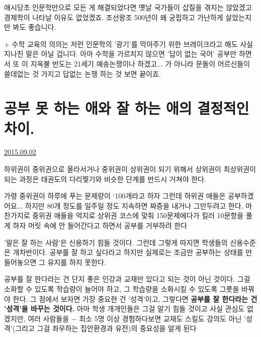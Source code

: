 애시당초 인문학만으로 모든 게 해결되었다면 옛날 국가들이 삽질을 겪지는 않았겠고
경제학이 나타날 이유도 없었겠죠.
조선왕조 500년이 왜 궁핍하고 가난하게 살았는지만 봐도 좋습니다.
\vspace{5mm}

+ 수학 교육의 의의는 저런 인문학의 '광기'를 막아주기 위한 브레이크라고 해도 사실 지나친 말은 아닐 겁니다.
아마 수학을 가르치지 않으면 '답이 없는 국어' 공부만 하면서 또 이 지옥불 반도는 21세기 예송논쟁이나 하겠고... 가 아니라
문돌이 어르신들이 쓸데없는 것 가지고 답없는 논쟁 하는 것 보면 끝이죠.
\vspace{5mm}








\section{공부 못 하는 애와 잘 하는 애의 결정적인 차이.}
\href{https://www.kockoc.com/Apoc/284872}{2015.09.02}

\vspace{5mm}

하위권이 중위권으로 올라서거나 중위권이 상위권이 되기 위해서
상위권이 최상위권이 되는 과정은 태권도의 다리찢기와 비슷한 단계를 반드시 거쳐야 한다.
\vspace{5mm}

가령 중위권이 하루에 푸는 문제량이 `100개라고 하자
그런데 하위권 애들은 공부하겠어요... 하지만 80개 정도를 일주일 정도 지속하면 짜증을 내거나 그만두려고 한다.
마찬가지로 중위권 애들을 억지로 상위권 코스에 맞춰 150문제에다가 킬러 10문항을 풀게 하자
머릿 속에 안 들어간다고 하면서 공부를 거부하려 한다
\vspace{5mm}

'말은 잘 하는 사람'은 신용하기 힘들 것이다.
그런데 그렇게 따지면 학생들의 신용수준은 개차반이다.
공부를 잘 하고 싶다라고 하지만 실제로는 조금만 공부하는 상태를 만들어놓으면 그 유지를 하지 못한다.
\vspace{5mm}

공부를 잘 한다라는 건 단지 좋은 인강과 교재만 있다고 되는 것이 아닌 것이다.
그걸 소화할 수 있도록 학습량이 늘어야 하고, 그 학습량을 소화시킬 수 있도록 그릇을 바꿔야 한다.
그 점에서 보자면 가장 중요한 건 '성격'이고, 그렇다면 \textbf{공부를 잘 한다라는 건 '성격'을 바꾸는 것이다.}
아마 학생 개개인들은 그걸 알기 힘들 것이고 사실 관심도 없겠지만,
여러 사람들을 $-$ 최소 5명 이상 경험하다보면 교재도 스킬도 강의도 아닌 '성격'(그리고 그걸 좌우하는 집안환경과 유전)의 중요성을 알게 된다
\vspace{5mm}

